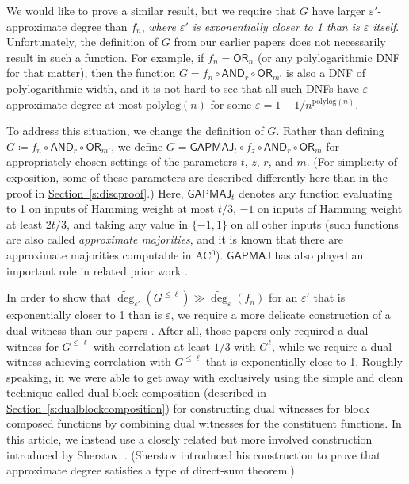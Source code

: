 \documentclass[11pt]{article}
\numberwithin{equation}{section}
\theoremstyle{definition}
\theoremstyle{plain}
\newcommand{\expref}[2]{\hyperref[#2]{#1~\ref{#2}}}
\newcommand{\polylog}{\mathrm{polylog}}
\newcommand{\OR}{\mathsf{ OR}}
\newcommand{\GAPMAJ}{\mathsf{GAPMAJ}}
\newcommand{\eps}{\varepsilon}
\newcommand{\adeg}{\widetilde{\operatorname{deg}}}
\newcommand{\AND}{\mathsf{AND}}
\begin{document}
We would like to prove a similar result, but we require that $G$ have larger $\eps'$-approximate degree than $f_n$, \emph{where $\eps'$ is exponentially closer to 1
	than is $\eps$ itself}. 
Unfortunately, the definition of $G$ from our
%
earlier papers  %
\cite{adegsurj, bkt} does not necessarily result in such a function. For example, if $f_n = \OR_n$
(or any polylogarithmic DNF for that matter), then the function $G=f_n \circ \AND_r \circ \OR_{m'}$ is also a DNF of polylogarithmic width, and 
it is not hard to see that all such DNFs have $\eps$-approximate degree at most $\polylog(n)$ for some $\eps=1-1/n^{\polylog(n)}$. 

To address this situation, we change the definition of $G$. Rather than defining  $G\coloneqq f_n \circ \AND_r \circ \OR_{m'}$, we
define $G=\GAPMAJ_t  \circ f_z \circ \AND_r \circ \OR_{m}$ for appropriately chosen settings of the parameters $t$, $z$, $r$, and $m$. (For simplicity of exposition, some of these parameters are described differently here than in the proof in \expref{Section}{s:discproof}.)
Here, $\GAPMAJ_t$ denotes any function evaluating to 1 on inputs of Hamming weight at most $t/3$, $-1$ on inputs of Hamming weight
at least $2t/3$, and taking any value in $\{-1, 1\}$ on all other inputs (such functions are also called \emph{approximate majorities}, and 
it is known that there are approximate majorities computable in AC$^0$). $\GAPMAJ$ has also played an important role
in related prior work \cite{bchtv, adegsurj}.

In order to show that $\adeg_{\eps'}(G^{\leq \ell}) \gg \adeg_{\eps}(f_n)$ for an $\eps'$ that is exponentially closer to 1 than is $\eps$,
we require a more delicate construction of a dual witness than our
%
%
papers \cite{adegsurj, bkt}.  %
After all, %
those papers   %
 only required a dual witness for $G^{\leq \ell}$ with correlation at least $1/3$ with $G^{\ell}$, while we require
a dual witness achieving correlation with $G^{\leq \ell}$ that is exponentially close to 1. 
Roughly speaking, %
in \cite{adegsurj, bkt} we %
%
were able to get away
with exclusively using the simple and clean technique called dual block composition (described in \expref{Section}{s:dualblockcomposition}) for constructing
dual witnesses for block composed functions by combining dual witnesses for the constituent functions. %
In this %
article,  %
we instead use a closely related but more involved
construction introduced by Sherstov~\cite{sherstovdp}. (Sherstov introduced his construction to prove that approximate degree satisfies a type of direct-sum theorem.)
\end{document}
